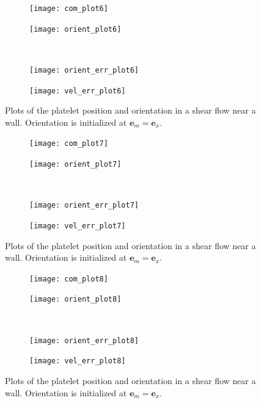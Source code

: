 \documentclass{article}
\newcommand{\vect}[1]{\boldsymbol{\mathbf{#1}}}
\begin{document}
\begin{figure}
  \centering
  \begin{subfigure}{0.49\textwidth}
    \texttt{[image: com\_plot6]}
  \end{subfigure}
  \hfill
  \begin{subfigure}{0.49\textwidth}
    \texttt{[image: orient\_plot6]}
  \end{subfigure}
  \\
  \begin{subfigure}{0.49\textwidth}
    \texttt{[image: orient\_err\_plot6]}
  \end{subfigure}
  \hfill
  \begin{subfigure}{0.49\textwidth}
    \texttt{[image: vel\_err\_plot6]}
  \end{subfigure}
  \caption{Plots of the platelet position and orientation in a shear
    flow near a wall. Orientation is initialized at $\vect{e}_m =
    \vect{e}_x$.} 
  \label{fig:com_plot6}
\end{figure}

\begin{figure}
  \centering
  \begin{subfigure}{0.49\textwidth}
    \texttt{[image: com\_plot7]}
  \end{subfigure}
  \hfill
  \begin{subfigure}{0.49\textwidth}
    \texttt{[image: orient\_plot7]}
  \end{subfigure}
  \\
  \begin{subfigure}{0.49\textwidth}
    \texttt{[image: orient\_err\_plot7]}
  \end{subfigure}
  \hfill
  \begin{subfigure}{0.49\textwidth}
    \texttt{[image: vel\_err\_plot7]}
  \end{subfigure}
  \caption{Plots of the platelet position and orientation in a shear
    flow near a wall. Orientation is initialized at $\vect{e}_m =
    \vect{e}_x$.} 
  \label{fig:com_plot7}
\end{figure}

\begin{figure}
  \centering
  \begin{subfigure}{0.49\textwidth}
    \texttt{[image: com\_plot8]}
  \end{subfigure}
  \hfill
  \begin{subfigure}{0.49\textwidth}
    \texttt{[image: orient\_plot8]}
  \end{subfigure}
  \\
  \begin{subfigure}{0.49\textwidth}
    \texttt{[image: orient\_err\_plot8]}
  \end{subfigure}
  \hfill
  \begin{subfigure}{0.49\textwidth}
    \texttt{[image: vel\_err\_plot8]}
  \end{subfigure}
  \caption{Plots of the platelet position and orientation in a shear
    flow near a wall. Orientation is initialized at $\vect{e}_m =
    \vect{e}_x$.} 
  \label{fig:com_plot8}
\end{figure}
\end{document}
